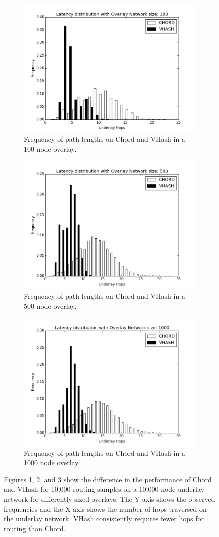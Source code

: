 \begin{figure}

\begin{subfigure}{\columnwidth}
\centering
	\includegraphics[width=0.5\linewidth]{figs/hist_100}
	\caption{Frequency of path lengths on Chord and VHash in a 100 node overlay.}
	\label{fig:hist100}
\end{subfigure}

\begin{subfigure}{\columnwidth}
	\centering
	\includegraphics[width=0.5\linewidth]{figs/hist_500}
	\caption{Frequency of path lengths on Chord and VHash in a 500 node overlay.}
	\label{fig:hist500}
\end{subfigure}

\begin{subfigure}{\columnwidth}
	\centering
	\includegraphics[width=0.5\linewidth]{figs/hist_1000}
	\caption{Frequency of path lengths on Chord and VHash in a 1000 node overlay.}
	\label{fig:hist1000}
\end{subfigure}

\caption[VHash path lengths]{Figures \ref{fig:hist100}, \ref{fig:hist500}, and \ref{fig:hist1000} show the difference in the performance of Chord and VHash for 10,000 routing samples on a 10,000 node underlay network for differently sized overlays.
The Y axis shows the observed frequencies and the X axis shows the number of hops traversed on the underlay network.
VHash consistently requires fewer hops for routing than Chord.}
\label{fig:hist}

\end{figure}




